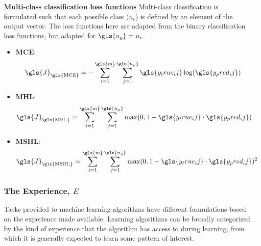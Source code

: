 \textbf{Multi-class classification loss functions}
Multi-class classification is formulated such that each possible class ($n_c$)
is defined by an element of the output vector. The loss functions here are
adapted from the binary classification loss functions, but adapted for
$\gls{n_y}=n_c$.

\begin{itemize}
    \item \textbf{\Gls{MCE}}:
    \begin{equation}
        \gls{J}_\text{\gls{MCE}}=-\sum_{i=1}^{\gls{m}}\sum_{j=1}^{\gls{n_y}}\gls{y_true_ij}\log(\gls{y_pred_ij})
    \end{equation}
    \item \textbf{\Gls{MHL}}:
    \begin{equation}
        \gls{J}_\text{\gls{MHL}}=\sum_{i=1}^{\gls{m}}\sum_{j=1}^{\gls{n_y}}\max(0, {1-\gls{y_true_ij}\cdot{}\gls{y_pred_ij}})
    \end{equation}
    \item \textbf{\Gls{MSHL}}:
    \begin{equation}
        \gls{J}_\text{\gls{MSHL}}=\sum_{i=1}^{\gls{m}}\sum_{j=1}^{\gls{n_y}}\max(0, {1-\gls{y_true_ij}\cdot{}\gls{y_pred_ij}})^2
    \end{equation}
\end{itemize}


\begin{itemize}
\end{itemize}


\subsubsection{The Experience, $E$\label{sec:ML-experience}}
Tasks provided to machine learning algorithms have different formulations based
on the experience made available. Learning algorithms can be broadly categorized
by the kind of experience that the algorithm has access to during learning, from
which it is generally expected to learn some pattern of interest.

